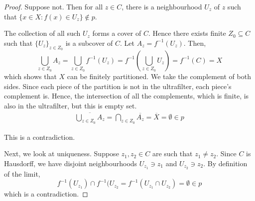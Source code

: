\documentclass[11pt,letterpaper]{article}
\newcommand{\inv}{^{-1}}
\newcommand{\Union}{\bigcup}
\newcommand{\Intersn}{\bigcap}
\newcommand{\parens}[1]{\left(#1\right)}
\newcommand{\compl}{\overline}
\newcommand{\intersn}{\cap}
\begin{document}
\begin{proof}
    Suppose not. Then for all $z \in C$, there is a neighbourhood $U_z$ of $z$
    such that $\{ x \in X : f(x) \in U_z \} \notin p$.

    The collection of all such $U_z$ forms a cover of $C$. Hence there exists
    finite $Z_0 \subseteq C$ such that $\{U_z\}_{z \in Z_0}$ is a subcover of
    $C$. Let $A_z = f\inv (U_z)$. Then,
    \begin{equation*}
        \Union_{z \in Z_0} A_z
        = \Union_{z \in Z_0} f\inv (U_z)
        = f\inv \parens{ \Union_{z \in Z_0} U_z }
        = f\inv (C)
        = X
    \end{equation*}
    which shows that $X$ can be finitely partitioned. We take the complement of
    both sides. Since each piece of the partition is not in the ultrafilter,
    each piece's complement is. Hence, the intersection of all the complements,
    which is finite, is also in the ultrafilter, but this is empty set.
    \begin{align*}
        \compl{ \Union_{z \in Z_0} A_z }
        = \Intersn_{z \in Z_0} \compl{A_z}
        = \compl{X}
        = \emptyset
        \in p
    \end{align*}

    This is a contradiction.

    Next, we look at uniqueness. Suppose $z_1, z_2 \in C$ are such that
    $z_1 \neq z_2$. Since $C$ is Hausdorff, we have disjoint neighbourhoods
    $U_{z_1} \ni z_1$ and $U_{z_2} \ni z_2$. By definition of the limit,
    \begin{equation*}
        f\inv (U_{z_1}) \intersn f\inv (U_{z_2}
        = f\inv (U_{z_1} \intersn U_{z_2})
        = \emptyset
        \in p
    \end{equation*}
    which is a contradiction.
\end{proof}
\end{document}
